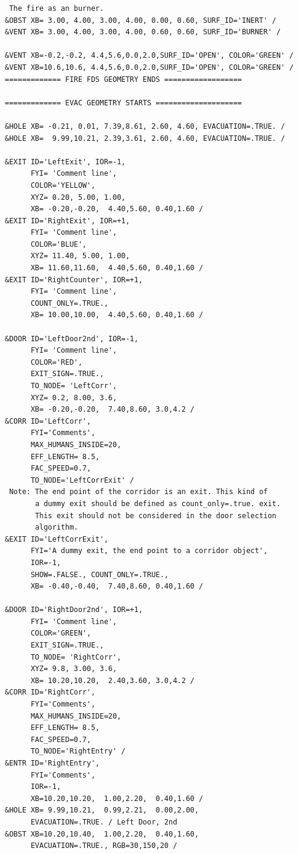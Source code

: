 \documentclass[12pt,a4paper,final,twoside]{stylevk}
\begin{document}
{\begin{verbatim}
 The fire as an burner.
&OBST XB= 3.00, 4.00, 3.00, 4.00, 0.00, 0.60, SURF_ID='INERT' /
&VENT XB= 3.00, 4.00, 3.00, 4.00, 0.60, 0.60, SURF_ID='BURNER' /

&VENT XB=-0.2,-0.2, 4.4,5.6,0.0,2.0,SURF_ID='OPEN', COLOR='GREEN' / 
&VENT XB=10.6,10.6, 4.4,5.6,0.0,2.0,SURF_ID='OPEN', COLOR='GREEN' / 
============= FIRE FDS GEOMETRY ENDS ==================

============= EVAC GEOMETRY STARTS ====================

&HOLE XB= -0.21, 0.01, 7.39,8.61, 2.60, 4.60, EVACUATION=.TRUE. /
&HOLE XB=  9.99,10.21, 2.39,3.61, 2.60, 4.60, EVACUATION=.TRUE. /

&EXIT ID='LeftExit', IOR=-1,
      FYI= 'Comment line',
      COLOR='YELLOW',
      XYZ= 0.20, 5.00, 1.00,
      XB= -0.20,-0.20,  4.40,5.60, 0.40,1.60 /
&EXIT ID='RightExit', IOR=+1,
      FYI= 'Comment line',
      COLOR='BLUE',
      XYZ= 11.40, 5.00, 1.00,
      XB= 11.60,11.60,  4.40,5.60, 0.40,1.60 /
&EXIT ID='RightCounter', IOR=+1,
      FYI= 'Comment line',
      COUNT_ONLY=.TRUE.,
      XB= 10.00,10.00,  4.40,5.60, 0.40,1.60 /

&DOOR ID='LeftDoor2nd', IOR=-1,
      FYI= 'Comment line',
      COLOR='RED',
      EXIT_SIGN=.TRUE.,
      TO_NODE= 'LeftCorr',
      XYZ= 0.2, 8.00, 3.6,
      XB= -0.20,-0.20,  7.40,8.60, 3.0,4.2 /
&CORR ID='LeftCorr',
      FYI='Comments',
      MAX_HUMANS_INSIDE=20,
      EFF_LENGTH= 8.5,
      FAC_SPEED=0.7,
      TO_NODE='LeftCorrExit' /
 Note: The end point of the corridor is an exit. This kind of
       a dummy exit should be defined as count_only=.true. exit.
       This exit should not be considered in the door selection
       algorithm.
&EXIT ID='LeftCorrExit',
      FYI='A dummy exit, the end point to a corridor object',
      IOR=-1,
      SHOW=.FALSE., COUNT_ONLY=.TRUE.,
      XB= -0.40,-0.40,  7.40,8.60, 0.40,1.60 /
      
&DOOR ID='RightDoor2nd', IOR=+1,
      FYI= 'Comment line',
      COLOR='GREEN',
      EXIT_SIGN=.TRUE.,
      TO_NODE= 'RightCorr',
      XYZ= 9.8, 3.00, 3.6,
      XB= 10.20,10.20,  2.40,3.60, 3.0,4.2 /
&CORR ID='RightCorr',
      FYI='Comments',
      MAX_HUMANS_INSIDE=20,
      EFF_LENGTH= 8.5,
      FAC_SPEED=0.7,
      TO_NODE='RightEntry' /
&ENTR ID='RightEntry',
      FYI='Comments',
      IOR=-1,
      XB=10.20,10.20,  1.00,2.20,  0.40,1.60 /
&HOLE XB= 9.99,10.21,  0.99,2.21,  0.00,2.00, 
      EVACUATION=.TRUE. / Left Door, 2nd
&OBST XB=10.20,10.40,  1.00,2.20,  0.40,1.60, 
      EVACUATION=.TRUE., RGB=30,150,20 /


\end{verbatim}}
\end{document}
